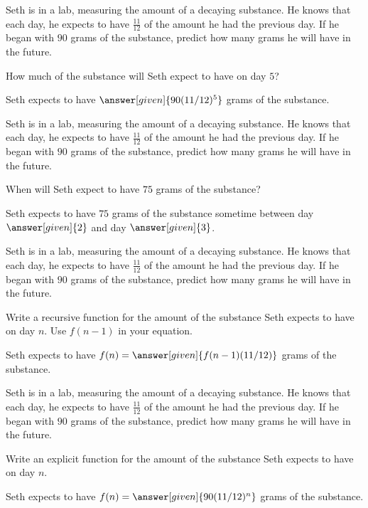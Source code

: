 \documentclass[nooutcomes]{ximera}
\begin{document}
\begin{problem}
Seth is in a lab, measuring the amount of a decaying substance.  He knows that each day, he expects to have $\frac{11}{12}$ of the amount he had the previous day.  If he began with $90$ grams of the substance, predict how many grams he will have in the future.

How much of the substance will Seth expect to have on day $5$?
\begin{prompt}
Seth expects to have $\answer[given]{90(11/12)^{5}}$ grams of the substance.
\end{prompt}

\end{problem}



\begin{problem}
Seth is in a lab, measuring the amount of a decaying substance.  He knows that each day, he expects to have $\frac{11}{12}$ of the amount he had the previous day.  If he began with $90$ grams of the substance, predict how many grams he will have in the future.

When will Seth expect to have $75$ grams of the substance?
\begin{prompt}
Seth expects to have $75$ grams of the substance sometime between day $\answer[given]{2}$ and day $\answer[given]{3}$.
\end{prompt}

\end{problem}




\begin{problem}
Seth is in a lab, measuring the amount of a decaying substance.  He knows that each day, he expects to have $\frac{11}{12}$ of the amount he had the previous day.  If he began with $90$ grams of the substance, predict how many grams he will have in the future.

Write a recursive function for the amount of the substance Seth expects to have on day $n$.  Use $f(n-1)$ in your equation.
\begin{prompt}
Seth expects to have $f(n) = \answer[given]{f(n-1)(11/12)}$ grams of the substance.
\end{prompt}

\end{problem}




\begin{problem}
Seth is in a lab, measuring the amount of a decaying substance.  He knows that each day, he expects to have $\frac{11}{12}$ of the amount he had the previous day.  If he began with $90$ grams of the substance, predict how many grams he will have in the future.

Write an explicit function for the amount of the substance Seth expects to have on day $n$.
\begin{prompt}
Seth expects to have $f(n) = \answer[given]{90(11/12)^n}$ grams of the substance.
\end{prompt}

\end{problem}
\end{document}
